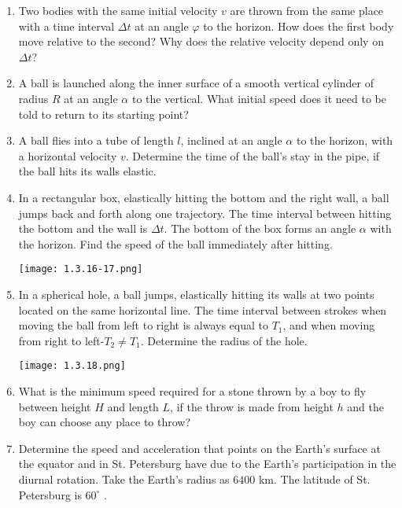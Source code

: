 \documentclass{article}
\begin{document}
\begin{enumerate}[label=1.3.\arabic*]
\item Two bodies with the same initial velocity $v$ are thrown from the same place with a time interval $\Delta t$ at an angle $\varphi$ to the horizon. How does the first body move relative to the second? Why does the relative velocity depend only on $\Delta t$?

\item A ball is launched along the inner surface of a smooth vertical cylinder of radius $R$ at an angle $\alpha$ to the vertical. What initial speed does it need to be told to return to its starting point?

\item A ball flies into a tube of length $l$, inclined at an angle $\alpha$ to the horizon, with a horizontal velocity $v$. Determine the time of the ball's stay in the pipe, if the ball hits its walls elastic.

\item In a rectangular box, elastically hitting the bottom and the right wall, a ball jumps back and forth along one trajectory. The time interval between hitting the bottom and the wall is $\Delta t$. The bottom of the box forms an angle $\alpha$ with the horizon. Find the speed of the ball immediately after hitting.

\begin{center}
    \texttt{[image: 1.3.16-17.png]}
\end{center}

\item In a spherical hole, a ball jumps, elastically hitting its walls at two points located on the same horizontal line. The time interval between strokes when moving the ball from left to right is always equal to $T_1$, and when moving from right to left-$T_2 \ne T_1$. Determine the radius of the hole.

\begin{center}
    \texttt{[image: 1.3.18.png]}
\end{center}

\item What is the minimum speed required for a stone thrown by a boy to fly between height $H$ and length $L$, if the throw is made from height $h$ and the boy can choose any place to throw?

\item Determine the speed and acceleration that points on the Earth's surface at the equator and in St. Petersburg have due to the Earth's participation in the diurnal rotation. Take the Earth's radius as $6400$ km. The latitude of St. Petersburg is $60^\circ$ .


\end{enumerate}
\end{document}

